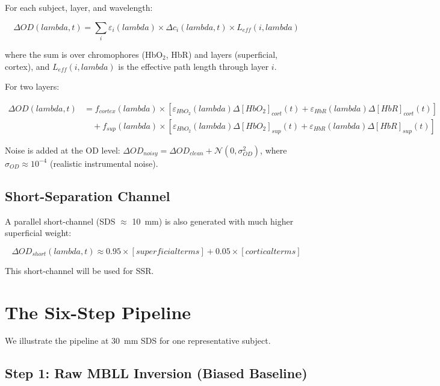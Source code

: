 \documentclass[12pt]{article}
\def\lambda{lambda}%
\def\text#1{#1}%
\begin{document}
For each subject, layer, and wavelength:

\begin{equation}
\Delta\text{OD}(\lambda, t) = \sum_i \varepsilon_i(\lambda) \times \Delta c_i(\lambda, t) \times L_{\text{eff}}(i, \lambda)
\end{equation}

where the sum is over chromophores (HbO$_2$, HbR) and layers (superficial, cortex), and $L_{\text{eff}}(i, \lambda)$ is the effective path length through layer $i$.

For two layers:

\begin{align}
\Delta\text{OD}(\lambda, t) &= f_{\text{cortex}}(\lambda) \times [\varepsilon_{\text{HbO}_2}(\lambda) \Delta[\text{HbO}_2]_{\text{cort}}(t) + \varepsilon_{\text{HbR}}(\lambda) \Delta[\text{HbR}]_{\text{cort}}(t)] \\
&\quad + f_{\text{sup}}(\lambda) \times [\varepsilon_{\text{HbO}_2}(\lambda) \Delta[\text{HbO}_2]_{\text{sup}}(t) + \varepsilon_{\text{HbR}}(\lambda) \Delta[\text{HbR}]_{\text{sup}}(t)]
\end{align}

Noise is added at the OD level: $\Delta\text{OD}_{\text{noisy}} = \Delta\text{OD}_{\text{clean}} + \mathcal{N}(0, \sigma_{\text{OD}}^2)$, where $\sigma_{\text{OD}} \approx 10^{-4}$ (realistic instrumental noise).

\subsection{Short-Separation Channel}

A parallel short-channel (SDS $\approx$ 10~mm) is also generated with much higher superficial weight:

\begin{equation}
\Delta\text{OD}_{\text{short}}(\lambda, t) \approx 0.95 \times [\text{superficial terms}] + 0.05 \times [\text{cortical terms}]
\end{equation}

This short-channel will be used for SSR.

\section{The Six-Step Pipeline}

We illustrate the pipeline at 30~mm SDS for one representative subject.

\subsection{Step 1: Raw MBLL Inversion (Biased Baseline)}
\end{document}

